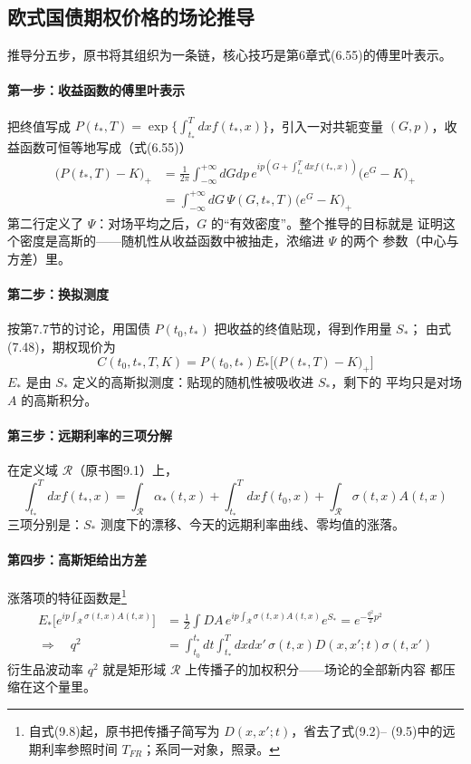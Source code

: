 \subsection{欧式国债期权价格的场论推导}

推导分五步，原书将其组织为一条链，核心技巧是第6章式(6.55)的傅里叶表示。

\paragraph{第一步：收益函数的傅里叶表示}
把终值写成 $P(t_*,T)=\exp\{\int_{t_*}^{T}dxf(t_*,x)\}$，引入一对共轭变量
$(G,p)$，收益函数可恒等地写成（式(6.55)）
\begin{align*}
\bigl(P(t_*,T)-K\bigr)_{+}
&=\frac{1}{2\pi}\int_{-\infty}^{+\infty}dGdp\,
e^{ip(G+\int_{t_*}^{T}dxf(t_*,x))}\bigl(e^{G}-K\bigr)_{+}\\
&=\int_{-\infty}^{+\infty}dG\,\Psi(G,t_*,T)\bigl(e^{G}-K\bigr)_{+}
\end{align*}
第二行定义了 $\Psi$：对场平均之后，$G$ 的“有效密度”。整个推导的目标就是
证明这个密度是高斯的——随机性从收益函数中被抽走，浓缩进 $\Psi$ 的两个
参数（中心与方差）里。

\paragraph{第二步：换拟测度}
按第7.7节的讨论，用国债 $P(t_0,t_*)$ 把收益的终值贴现，得到作用量 $S_*$；
由式(7.48)，期权现价为
\begin{equation*}
C(t_0,t_*,T,K)=P(t_0,t_*)E_{*}\bigl[\bigl(P(t_*,T)-K\bigr)_{+}\bigr]\tag{9.7}
\end{equation*}
$E_{*}$ 是由 $S_*$ 定义的高斯拟测度：贴现的随机性被吸收进 $S_*$，剩下的
平均只是对场 $A$ 的高斯积分。

\paragraph{第三步：远期利率的三项分解}
在定义域 $\mathcal{R}$（原书图9.1）上，
\begin{equation*}
\int_{t_*}^{T}dxf(t_*,x)=\int_{\mathcal{R}}\alpha_{*}(t,x)
+\int_{t_*}^{T}dxf(t_0,x)+\int_{\mathcal{R}}\sigma(t,x)A(t,x)
\end{equation*}
三项分别是：$S_{*}$ 测度下的漂移、今天的远期利率曲线、零均值的涨落。

\paragraph{第四步：高斯矩给出方差}
涨落项的特征函数是\footnote{自式(9.8)起，原书把传播子简写为 $D(x,x';t)$，省去了式(9.2)--
(9.5)中的远期利率参照时间 $T_{FR}$；系同一对象，照录。}
\begin{align*}
E_{*}\bigl[e^{ip\int_{\mathcal{R}}\sigma(t,x)A(t,x)}\bigr]
&=\frac{1}{Z}\int DA\,e^{ip\int_{\mathcal{R}}\sigma(t,x)A(t,x)}e^{S_{*}}
=e^{-\frac{q^{2}}{2}p^{2}}\\
\Rightarrow\quad
q^{2}&=\int_{t_0}^{t_*}dt\int_{t_*}^{T}dxdx'\,
\sigma(t,x)D(x,x';t)\sigma(t,x')\tag{9.8}
\end{align*}衍生品波动率
$q^{2}$ 就是矩形域 $\mathcal{R}$ 上传播子的加权积分——场论的全部新内容
都压缩在这个量里。

